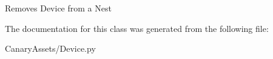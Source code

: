 \begin{DoxyVerb}Removes Device from a Nest\end{DoxyVerb}
 

The documentation for this class was generated from the following file\-:\begin{DoxyCompactItemize}
\item 
Canary\-Assets/Device.\-py\end{DoxyCompactItemize}
